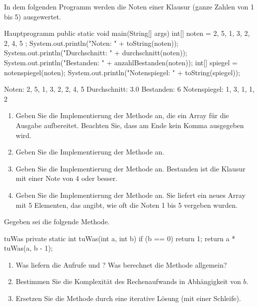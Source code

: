 In dem folgenden Programm werden die Noten einer Klausur (ganze Zahlen von 1 bis 5) ausgewertet.
\begin{javacode}[Ausschnitt]{Hauptprogramm}
public static void main(String[] args) {
	int[] noten = { 2, 5, 1, 3, 2, 2, 4, 5 };
	System.out.println("Noten: " + toString(noten));
	System.out.println("Durchschnitt: " + durchschnitt(noten));
	System.out.println("Bestanden: " + anzahlBestanden(noten));
	int[] spiegel = notenspiegel(noten);
	System.out.println("Notenspiegel: " + toString(spiegel));
}
\end{javacode}
\begin{konsole}
Noten: 2, 5, 1, 3, 2, 2, 4, 5
Durchschnitt: 3.0
Bestanden: 6
Notenspiegel: 1, 3, 1, 1, 2
\end{konsole}
\begin{enumerate}[label=\alph*)]
\item Geben Sie die Implementierung der Methode  an, die ein Array für die Ausgabe aufbereitet. Beachten Sie, dass am Ende kein Komma ausgegeben wird.
\item Geben Sie die Implementierung der Methode  an.
\item Geben Sie die Implementierung der Methode  an. Bestanden ist die Klausur mit einer Note von 4 oder besser.
\item Geben Sie die Implementierung der Methode  an. Sie liefert ein neues Array mit 5 Elementen, das angibt, wie oft die Noten 1 bis 5 vergeben wurden.
\end{enumerate}

Gegeben sei die folgende Methode.
\begin{javacode}[Ausschnitt]{tuWas}
private static int tuWas(int a, int b) {
	if (b == 0)
		return 1;
	return a * tuWas(a, b - 1);
}
\end{javacode}
\begin{enumerate}[label=\alph*)]
\item Was liefern die Aufrufe  und ? Was berechnet die Methode allgemein?
\item Bestimmen Sie die Komplexität des Rechenaufwands in Abhängigkeit von $b$.
\item Ersetzen Sie die Methode durch eine iterative Lösung (mit einer Schleife).
\end{enumerate}

